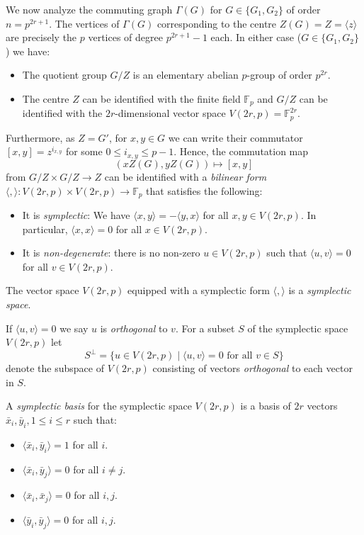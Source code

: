 \documentclass{elsarticle}
\newcommand{\F}{\mathbb{F}}
\renewcommand{\angle}[1]{\langle#1\rangle} %
\newcommand{\sympl}[1]{\langle #1 \rangle}
\begin{document}
We now analyze the commuting graph $\Gamma(G)$ for $G\in\{G_1,G_2\}$
of order $n=p^{2r+1}$. The vertices of $\Gamma(G)$ corresponding to
the centre $Z(G)=Z=\angle{z}$ are precisely the $p$ vertices of degree
$p^{2r+1}-1$ each. In either case ($G\in\{G_1,G_2\}$) we have:
\begin{itemize}
  \item The quotient group $G/Z$ is an elementary abelian $p$-group of order
    $p^{2r}$.
  \item The centre $Z$ can be identified with the finite field
$\F_p$ and $G/Z$ can be identified with the $2r$-dimensional vector
space $V(2r,p)=\F_p^{2r}$.
\end{itemize}

Furthermore, as $Z=G'$, for $x,y\in G$ we can write their commutator
$[x,y]=z^{i_{x,y}}$ for some $0\le i_{x,y}\le p-1$. Hence, the
commutation map
\[
(xZ(G),yZ(G))\mapsto [x,y]
\]
from $G/Z\times G/Z \to Z$ can be identified with a \emph{bilinear
form} $\sympl{,}: V(2r,p)\times V(2r,p) \to \F_p$ that satisfies
the following:

\begin{itemize}
\item It is \emph{symplectic}: We have $\sympl{x,y}=-\sympl{y,x}$ for
  all $x,y\in V(2r,p)$. In particular, $\sympl{x,x}=0$ for all $x\in
  V(2r,p)$.
\item It is \emph{non-degenerate}: there is no non-zero $u\in V(2r,p)$
  such that $\sympl{u,v}=0$ for all $v\in V(2r,p)$.
\end{itemize}

\begin{defn}\label{sympl-space-def}
  The vector space $V(2r,p)$ equipped with a symplectic form
  $\sympl{,}$ is a \emph{symplectic space}.
\end{defn}

If $\sympl{u,v}=0$ we say $u$ is \emph{orthogonal} to $v$. For a
subset $S$ of the symplectic space $V(2r,p)$ let
\[
S^\perp = \{u\in V(2r,p)\mid \sympl{u,v}=0 \text{ for all } v\in S\}
\]
denote the subspace of $V(2r,p)$ consisting of vectors
\emph{orthogonal} to each vector in $S$.

\begin{defn}\label{sympl-basis-def}
  A \emph{symplectic basis} for the symplectic space $V(2r,p)$ is a
  basis of $2r$ vectors $\bar{x}_i, \bar{y}_i, 1\le i\le r$ such
  that:
\begin{itemize}
\item $\sympl{\bar{x}_i,\bar{y}_i}=1$ for all $i$.
\item $\sympl{\bar{x}_i,\bar{y}_j}=0$ for all $i\ne j$.
\item $\sympl{\bar{x}_i,\bar{x}_j}=0$ for all $i,j$.
\item  $\sympl{\bar{y}_i,\bar{y}_j}=0$ for all $i,j$.
\end{itemize}
\end{defn}
\end{document}

